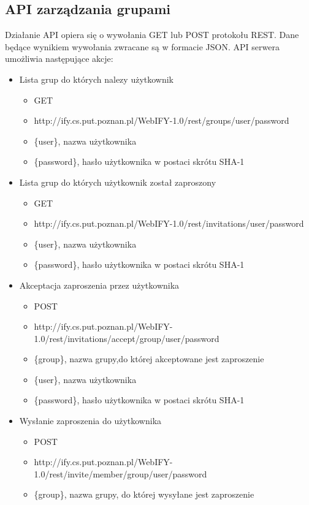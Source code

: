 \documentclass[11pt,a4paper,polish,thesis]{dcsbook}
\begin{document}
\subsection{API zarządzania grupami}
Działanie API opiera się o wywołania GET lub POST protokołu REST. Dane będące wynikiem wywołania zwracane są w formacie JSON.
API serwera umożliwia następujące akcje:
\begin{itemize}
	\item Lista grup do których nalezy użytkownik
	\begin{itemize}
		\item GET
		\item http://ify.cs.put.poznan.pl/WebIFY-1.0/rest/groups/{user}/{password} 
		\item \{user\}, nazwa użytkownika
		\item \{password\}, hasło użytkownika w postaci skrótu SHA-1
	\end{itemize}
	\item Lista grup do których użytkownik został zaproszony
	\begin{itemize}
		\item GET
		\item http://ify.cs.put.poznan.pl/WebIFY-1.0/rest/invitations/{user}/{password}
		\item \{user\}, nazwa użytkownika
		\item \{password\}, hasło użytkownika w postaci skrótu SHA-1
	\end{itemize}
	\item Akceptacja zaproszenia przez użytkownika
	\begin{itemize}
		\item POST
		\item http://ify.cs.put.poznan.pl/WebIFY-1.0/rest/invitations/accept/{group}/{user}/{password}
		\item \{group\}, nazwa grupy,do której akceptowane jest zaproszenie 
		\item \{user\}, nazwa użytkownika
		\item \{password\},  hasło użytkownika w postaci skrótu SHA-1
	\end{itemize}
	\item Wysłanie zaproszenia do użytkownika
	\begin{itemize}
		\item POST
		\item http://ify.cs.put.poznan.pl/WebIFY-1.0/rest/invite/{member}/{group}/{user}/{password}
		\item \{group\}, nazwa grupy, do której wysyłane jest zaproszenie

\end{itemize}
\end{itemize}
\end{document}
